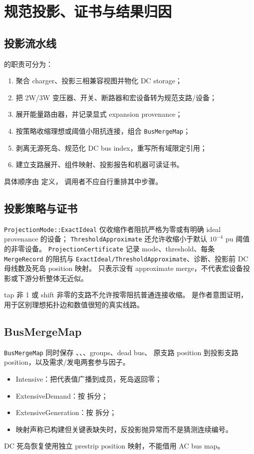 \section{规范投影、证书与结果归因}

\subsection{投影流水线}

 的职责可分为：
\begin{enumerate}
  \item 聚合 charger、投影三相兼容视图并物化 DC storage；
  \item 把 2W/3W 变压器、开关、断路器和宏设备转为规范支路/设备；
  \item 展开能量路由器，并记录显式 expansion provenance；
  \item 按策略收缩理想或阈值小阻抗连接，组合 \texttt{BusMergeMap}；
  \item 剥离无源死岛、规范化 DC bus index，重写所有域限定引用；
  \item 建立支路展开、组件映射、投影报告和机器可读证书。
\end{enumerate}
具体顺序由  定义，
调用者不应自行重排其中步骤。

\subsection{投影策略与证书}

\texttt{ProjectionMode::ExactIdeal} 仅收缩作者阻抗严格为零或有明确 ideal provenance 的设备；
\texttt{ThresholdApproximate} 还允许收缩小于默认 $10^{-4}$ pu 阈值的非零设备。
\texttt{ProjectionCertificate} 记录 mode、threshold、每条 \texttt{MergeRecord} 的阻抗与
\texttt{ExactIdeal/ThresholdApproximate}、诊断、投影前 DC 母线数及死岛 position 映射。
 只表示没有 approximate merge，不代表宏设备投影或下游分析整体无近似。

tap 非 1 或 shift 非零的支路不允许按零阻抗普通连接收缩。 是作者意图证明，
用于区别理想拓扑边和数值很短的真实线路。

\subsection{BusMergeMap}

\texttt{BusMergeMap} 同时保存
、、、groups、dead bus、
原支路 position 到投影支路 position，以及需求/发电两套参与因子。
\begin{itemize}
  \item Intensive：把代表值广播到成员，死岛返回零；
  \item ExtensiveDemand：按  拆分；
  \item ExtensiveGeneration：按  拆分；
  \item 映射声称已构建但关键表缺失时，反投影抛异常而不是猜测连续编号。
\end{itemize}
DC 死岛恢复使用独立 prestrip position 映射，不能借用 AC bus map。

